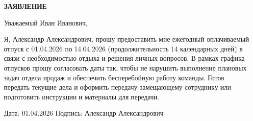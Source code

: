 \documentclass[12pt]{article}
\begin{document}
\begin{center}
\textbf{\LARGE ЗАЯВЛЕНИЕ}
\end{center}

\vspace{1cm}




Уважаемый Иван Иванович,

Я, Александр Александрович, прошу предоставить мне ежегодный оплачиваемый отпуск с 01.04.2026 по 14.04.2026 (продолжительность 14 календарных дней) в связи с необходимостью отдыха и решения личных вопросов. В рамках графика отпусков прошу согласовать даты так, чтобы не нарушить выполнение плановых задач отдела продаж и обеспечить бесперебойную работу команды. Готов передать текущие дела и оформить передачу замещающему сотруднику или подготовить инструкции и материалы для передачи.

\vfill

\noindent
Дата: 01.04.2026 \hfill Подпись: Александр Александрович
\end{document}
